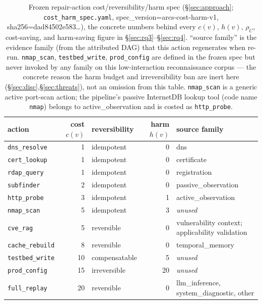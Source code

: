 \begin{table}[t]\centering\small
\caption{Frozen repair-action cost/reversibility/harm spec (\S\ref{sec:approach}; \texttt{cost\_harm\_spec.yaml}, spec\_version=arcs-cost-harm-v1, sha256=dad84502e583\ldots), the concrete numbers behind every $c(v)$, $h(v)$, $\rho_C$, cost-saving, and harm-saving figure in \S\ref{sec:rq3}--\S\ref{sec:rq4}. ``source family'' is the evidence family (from the attributed DAG) that this action regenerates when re-run. \texttt{nmap\_scan}, \texttt{testbed\_write}, \texttt{prod\_config} are defined in the frozen spec but never invoked by any family on this low-interaction reconnaissance corpus --- the concrete reason the harm budget and irreversibility ban are inert here (\S\ref{sec:disc},\S\ref{sec:threats}), not an omission from this table. \texttt{nmap\_scan} is a generic active port-scan action; the pipeline's passive InternetDB lookup tool (code name \texttt{nmap}) belongs to active\_observation and is costed as \texttt{http\_probe}.}
\label{tab:cost-harm-spec}
\begin{tabular}{lrlrl}\toprule
action & cost $c(v)$ & reversibility & harm $h(v)$ & source family\\\midrule
\texttt{dns\_resolve} & 1 & idempotent & 0 & dns\\
\texttt{cert\_lookup} & 1 & idempotent & 0 & certificate\\
\texttt{rdap\_query} & 1 & idempotent & 0 & registration\\
\texttt{subfinder} & 2 & idempotent & 0 & passive\_observation\\
\texttt{http\_probe} & 3 & idempotent & 1 & active\_observation\\
\texttt{nmap\_scan} & 5 & idempotent & 3 & \emph{unused}\\
\texttt{cve\_rag} & 5 & reversible & 0 & \shortstack[l]{vulnerability context;\\applicability validation}\\
\texttt{cache\_rebuild} & 8 & reversible & 0 & temporal\_memory\\
\texttt{testbed\_write} & 10 & compensatable & 5 & \emph{unused}\\
\texttt{prod\_config} & 15 & irreversible & 20 & \emph{unused}\\
\texttt{full\_replay} & 20 & reversible & 0 & llm\_inference, \allowbreak system\_diagnostic, \allowbreak other\\
\bottomrule\end{tabular}\end{table}
